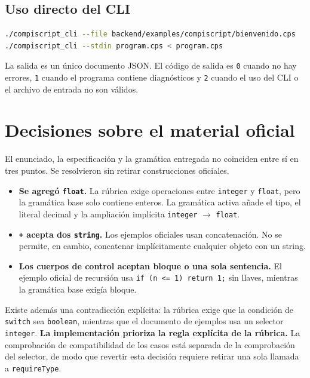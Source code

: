 \documentclass[11pt,a4paper]{article}
\begin{document}
\subsection{Uso directo del CLI}

\begin{lstlisting}[language=bash,caption={Análisis desde la línea de comandos.}]
./compiscript_cli --file backend/examples/compiscript/bienvenido.cps
./compiscript_cli --stdin program.cps < program.cps
\end{lstlisting}

La salida es un único documento JSON. El código de salida es \texttt{0} cuando
no hay errores, \texttt{1} cuando el programa contiene diagnósticos y
\texttt{2} cuando el uso del CLI o el archivo de entrada no son válidos.

\section{Decisiones sobre el material oficial}

El enunciado, la especificación y la gramática entregada no coinciden entre sí
en tres puntos. Se resolvieron sin retirar construcciones oficiales.

\begin{itemize}[leftmargin=1.4em]
  \item \textbf{Se agregó \texttt{float}.} La rúbrica exige operaciones entre
        \texttt{integer} y \texttt{float}, pero la gramática base solo contiene
        enteros. La gramática activa añade el tipo, el literal decimal y la
        ampliación implícita \texttt{integer} $\rightarrow$ \texttt{float}.
  \item \textbf{\texttt{+} acepta dos \texttt{string}.} Los ejemplos oficiales
        usan concatenación. No se permite, en cambio, concatenar implícitamente
        cualquier objeto con un string.
  \item \textbf{Los cuerpos de control aceptan bloque o una sola sentencia.} El
        ejemplo oficial de recursión usa \texttt{if (n <= 1) return 1;} sin
        llaves, mientras la gramática base exigía bloque.
\end{itemize}

Existe además una contradicción explícita: la rúbrica exige que la condición de
\texttt{switch} sea \texttt{boolean}, mientras que el documento de ejemplos usa
un selector \texttt{integer}. \textbf{La implementación prioriza la regla
explícita de la rúbrica.} La comprobación de compatibilidad de los casos está
separada de la comprobación del selector, de modo que revertir esta decisión
requiere retirar una sola llamada a \texttt{requireType}.
\end{document}
